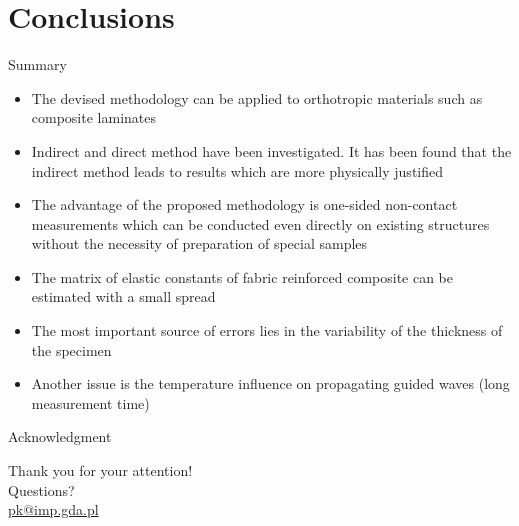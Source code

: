 \documentclass[10pt]{beamer} %
\begin{document}
\section{Conclusions}
\begin{frame}[t,label=frame29]{Summary}
\begin{itemize}
	\item The devised methodology can be applied to orthotropic materials such as composite laminates
	\item Indirect and direct method have been investigated. It has been found that the indirect method leads to results which are more physically justified
	\item The advantage of the proposed methodology is one-sided non-contact measurements which can be conducted even directly on existing structures without the necessity of preparation of special samples
	\item  The matrix of elastic constants of fabric reinforced composite can be estimated with a small spread
	\item The most important source of errors lies in the variability of the thickness of the specimen
	\item  Another issue is the temperature influence on propagating guided waves (long measurement time)
\end{itemize}
\end{frame}

\begin{frame}[t,label=frame29]{Acknowledgment}
	
\end{frame}
{
\begin{frame}[standout]
  Thank you for your attention!\\ \vspace{12pt}
  Questions?\\ \vspace{12pt}
  \url{pk@imp.gda.pl}
\end{frame}
}

\end{document}
